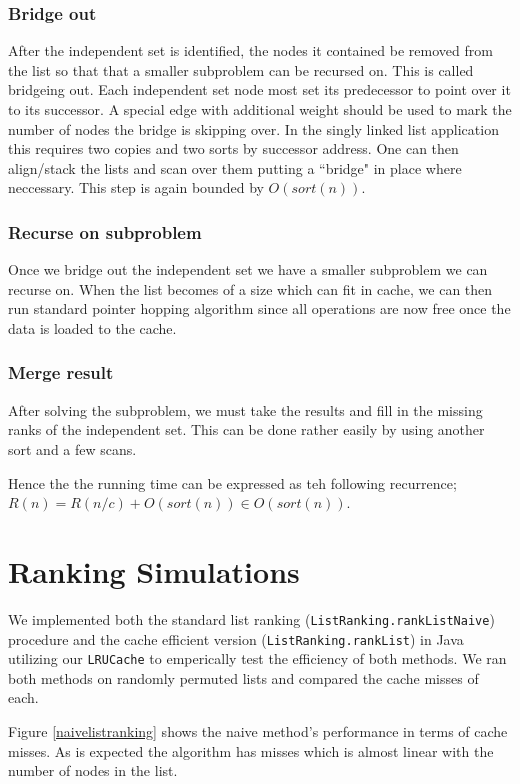 \documentclass[11pt]{article}
\begin{document}
\subsubsection{Bridge out}
After the independent set is identified, the nodes it contained be removed from the list so that that a smaller subproblem can be recursed on.
This is called bridgeing out.  Each independent set node most set its predecessor to point over it to its successor. A special edge 
with additional weight should be used to mark the number of nodes the bridge is skipping over.  In the singly linked list application this 
requires two copies and two sorts by successor address.  One can then align/stack the lists and scan over them putting a ``bridge" in place 
where neccessary.  This step is again bounded by $O(sort(n))$.

\subsubsection{Recurse on subproblem}
Once we bridge out the independent set we have a smaller subproblem we can recurse on.  When the list becomes of a size which can fit in cache, we can then run standard pointer hopping algorithm since all operations are now free once the data is loaded to the cache.

\subsubsection{Merge result}
After solving the subproblem, we must take the results and fill in the missing ranks of the independent set.  This can be done rather easily 
by using another sort and a few scans.

Hence the the running time can be expressed as teh following recurrence; $R(n) = R(n/c) + O(sort(n)) \in O(sort(n))$.

\section{Ranking Simulations}

We implemented both the standard list ranking (\texttt{ListRanking.rankListNaive}) procedure and the cache efficient version
 (\texttt{ListRanking.rankList}) in Java utilizing our \texttt{LRUCache} to emperically test the 
efficiency of  both methods.  We ran both methods on randomly permuted lists and compared the cache misses of each.  

Figure \ref{naivelistranking} shows the naive method's performance in terms of cache misses.  As is expected the algorithm has misses which is almost linear with the number of nodes in the list.
\end{document}
